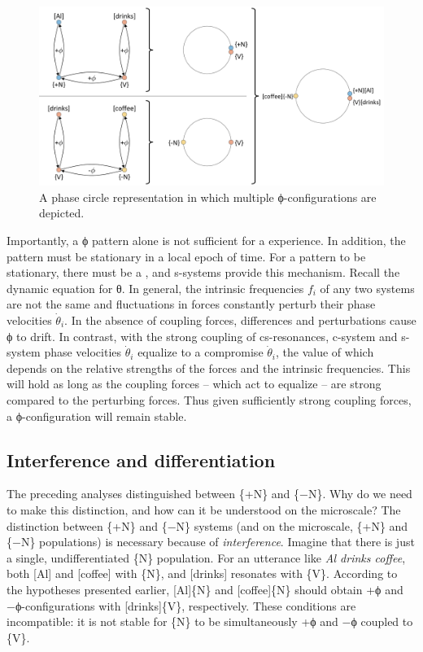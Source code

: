   
\begin{figure}
\includegraphics[width=\textwidth]{figures/Tilsen-img22.png}
\caption{A phase circle representation in which multiple ϕ-configurations are depicted.}
\label{fig:2:15}
\end{figure}
 

  Importantly, a ϕ pattern alone is not sufficient for a  experience. In addition, the pattern must be stationary in a local epoch of time. For a pattern to be stationary, there must be a , and s-systems provide this mechanism. Recall the dynamic equation for θ. In general, the intrinsic frequencies $f_i$ of any two systems are not the same and fluctuations in  forces constantly perturb their phase velocities $\dot{\theta}_i$. In the absence of coupling forces,  differences and  perturbations cause ϕ to drift. In contrast, with the strong coupling of cs-resonances, c-system and s-system phase velocities $\dot{\theta}_i$ equalize to a compromise $\dot{\theta}_i$, the value of which depends on the relative strengths of the forces and the intrinsic frequencies. This will hold as long as the coupling forces -- which act to equalize  -- are strong compared to the perturbing forces. Thus given sufficiently strong coupling forces, a ϕ-configuration will remain stable.

\subsection{Interference and differentiation}

The preceding analyses distinguished between \{+N\} and \{−N\}. Why do we need to make this distinction, and how can it be understood on the microscale? The distinction between \{+N\} and \{−N\} systems (and on the microscale, \{+N\} and \{−N\} populations) is necessary because of \textit{interference}. Imagine that there is just a single, undifferentiated \{N\} population. For an utterance like \textit{Al drinks coffee}, both [Al] and [coffee]  with \{N\}, and [drinks] resonates with \{V\}. According to the  hypotheses presented earlier, [Al]\{N\} and [coffee]\{N\} should obtain +ϕ and −ϕ-configurations with [drinks]\{V\}, respectively. These conditions are incompatible: it is not stable for \{N\} to be simultaneously +ϕ and −ϕ coupled to \{V\}.

